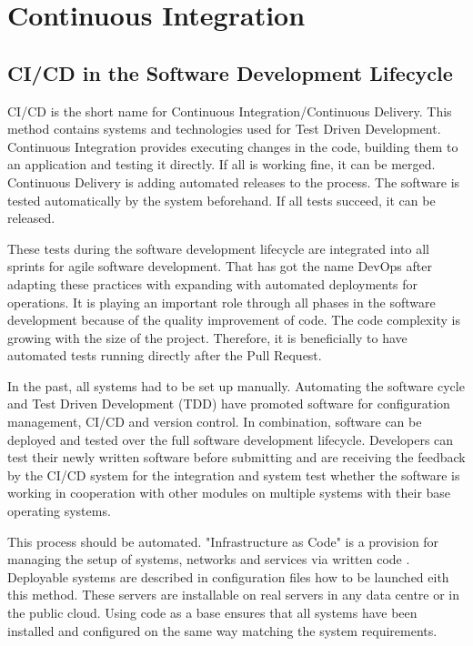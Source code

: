 \chapter{Continuous Integration}\label{ch:ci_cd}

\section{CI/CD in the Software Development Lifecycle}

\gls{CI/CD} is the short name for Continuous Integration/Continuous Delivery. This method contains systems and technologies used for Test Driven Development. Continuous Integration provides executing changes in the code, building them to an application and testing it directly. 
If all is working fine, it can be merged. Continuous Delivery is adding automated releases to the process. 
The software is tested automatically by the system beforehand. If all tests succeed, it can be released.

These tests during the software development lifecycle are integrated into all sprints for agile software development. That has got the name DevOps after adapting these practices with expanding with automated deployments for operations. It is playing an important role through all phases in the software development because of the quality improvement of code. The code complexity is growing with the size of the project. Therefore, it is beneficially to have automated tests running directly after the Pull Request. 

In the past, all systems had to be set up manually. Automating the software cycle and Test Driven Development (TDD) have promoted software for configuration management, \gls{CI/CD} and version control. In combination, software can be deployed and tested over the full software development lifecycle. Developers can test their newly written software before submitting and are receiving the feedback by the \gls{CI/CD} system for the integration and system test whether the software is working in cooperation with other modules on multiple systems with their base operating systems.

This process should be automated. "Infrastructure as Code" is a provision for managing the setup of systems, networks and services via written code \cite[~p.110]{Scholl2019}. Deployable systems are described in configuration files how to be launched eith this method. These servers are installable on real servers in any data centre or in the public cloud. Using code as a base ensures that all systems have been installed and configured on the same way matching the system requirements. 

